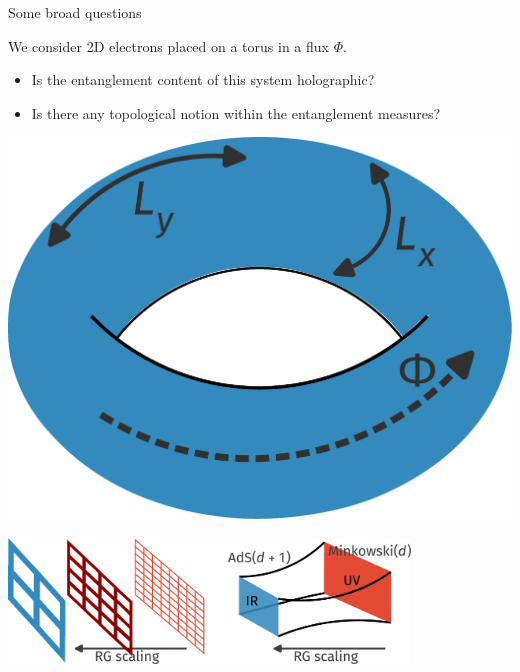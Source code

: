 \documentclass[aspectratio=169,t]{beamer}
\begin{document}
\begin{frame}{Some broad questions}
\begin{minipage}{0.65\textwidth}
We consider 2D electrons placed on a torus in a flux \(\Phi\).
\begin{itemize}
	\item Is the entanglement content of this system \alert{holographic}?\\[10pt]
	\item Is there any \alert{topological} notion within the entanglement measures?
\end{itemize}
\end{minipage}
\hspace*{\fill}
\begin{minipage}{0.3\textwidth}
	\includegraphics[width=\textwidth]{torus.pdf}
\end{minipage}

\vspace*{\fill}
\includegraphics[width=0.8\textwidth]{holography.pdf}
\end{frame}
\end{document}
